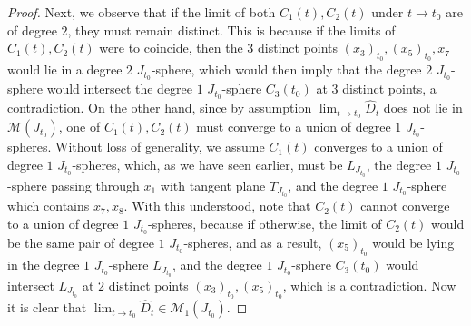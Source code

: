 \documentclass[11pt]{amsart}
\theoremstyle{plain}
\numberwithin{theorem}{section}
\theoremstyle{definition}
\newcommand{\M}{{\mathcal M}}
\begin{document}
\begin{proof}
Next, we observe that if the limit of both $C_1(t),C_2(t)$ under $t\rightarrow t_0$ are of degree $2$, they must remain distinct. This is because if the limits of $C_1(t),C_2(t)$ were to coincide, then the $3$ distinct points 
$(x_3)_{t_0}, (x_5)_{t_0},x_7$ would lie in a degree $2$ $J_{t_0}$-sphere, which would then imply that the
degree $2$ $J_{t_0}$-sphere would intersect the degree $1$ $J_{t_0}$-sphere $C_3(t_0)$ at $3$ distinct points, a
contradiction. On the other hand, since by assumption $\lim_{t\rightarrow t_0} \hat{D}_t$ does not lie in 
$\M(J_{t_0})$, one of $C_1(t),C_2(t)$ must converge to a union of degree $1$ $J_{t_0}$-spheres. Without loss of
generality, we assume $C_1(t)$ converges to a union of degree $1$ $J_{t_0}$-spheres, which, as we have seen earlier, must be $L_{J_{t_0}}$, the degree $1$ $J_{t_0}$-sphere passing through $x_1$ with tangent plane $T_{J_{t_0}}$, and the degree $1$ $J_{t_0}$-sphere which contains $x_7,x_8$. With this understood, note that $C_2(t)$ cannot converge to a union of degree $1$ $J_{t_0}$-spheres, because if otherwise, the limit of $C_2(t)$ would be the same pair of degree $1$ $J_{t_0}$-spheres, and as a result, $(x_5)_{t_0}$ would be lying in the degree $1$ $J_{t_0}$-sphere $L_{J_{t_0}}$, and the degree $1$ $J_{t_0}$-sphere $C_3(t_0)$ would intersect
 $L_{J_{t_0}}$ at $2$ distinct points $(x_3)_{t_0}, (x_5)_{t_0}$, which is a contradiction. Now it is clear that 
 $\lim_{t\rightarrow t_0} \hat{D}_t\in \M_1(J_{t_0})$.
 

\end{proof}
\end{document}
